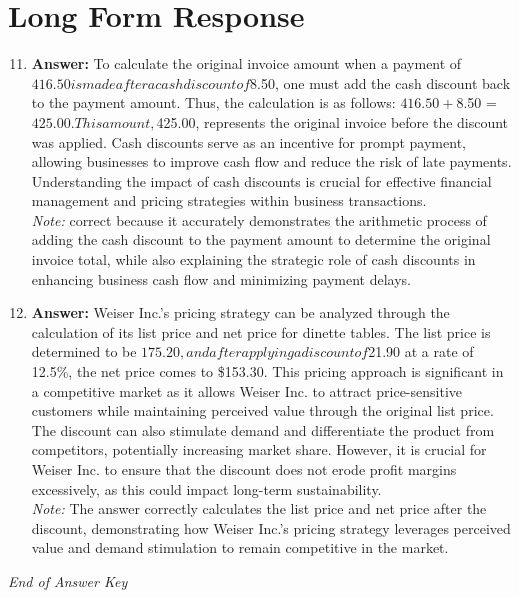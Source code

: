 \documentclass[12pt]{article}
\begin{document}
\section*{Long Form Response}
\begin{enumerate}[label=\arabic*.]
\setcounter{enumi}{10}
\item \textbf{Answer:} To calculate the original invoice amount when a payment of $416.50 is made after a cash discount of $8.50, one must add the cash discount back to the payment amount. Thus, the calculation is as follows: $416.50 + $8.50 = $425.00. This amount, $425.00, represents the original invoice before the discount was applied. Cash discounts serve as an incentive for prompt payment, allowing businesses to improve cash flow and reduce the risk of late payments. Understanding the impact of cash discounts is crucial for effective financial management and pricing strategies within business transactions.
\\ \textit{Note:} correct because it accurately demonstrates the arithmetic process of adding the cash discount to the payment amount to determine the original invoice total, while also explaining the strategic role of cash discounts in enhancing business cash flow and minimizing payment delays.
\item \textbf{Answer:} Weiser Inc.'s pricing strategy can be analyzed through the calculation of its list price and net price for dinette tables. The list price is determined to be $175.20, and after applying a discount of $21.90 at a rate of 12.5\%, the net price comes to \$153.30. This pricing approach is significant in a competitive market as it allows Weiser Inc. to attract price-sensitive customers while maintaining perceived value through the original list price. The discount can also stimulate demand and differentiate the product from competitors, potentially increasing market share. However, it is crucial for Weiser Inc. to ensure that the discount does not erode profit margins excessively, as this could impact long-term sustainability.
\\ \textit{Note:} The answer correctly calculates the list price and net price after the discount, demonstrating how Weiser Inc.'s pricing strategy leverages perceived value and demand stimulation to remain competitive in the market.
\end{enumerate}

\vfill
\noindent\textit{End of Answer Key}
\end{document}
